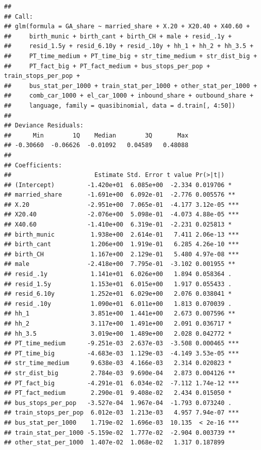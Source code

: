\documentclass[
]{article}
\begin{document}
\begin{verbatim}
## 
## Call:
## glm(formula = GA_share ~ married_share + X.20 + X20.40 + X40.60 + 
##     birth_munic + birth_cant + birth_CH + male + resid_.1y + 
##     resid_1.5y + resid_6.10y + resid_.10y + hh_1 + hh_2 + hh_3.5 + 
##     PT_time_medium + PT_time_big + str_time_medium + str_dist_big + 
##     PT_fact_big + PT_fact_medium + bus_stops_per_pop + train_stops_per_pop + 
##     bus_stat_per_1000 + train_stat_per_1000 + other_stat_per_1000 + 
##     comb_car_1000 + el_car_1000 + inbound_share + outbound_share + 
##     language, family = quasibinomial, data = d.train[, 4:50])
## 
## Deviance Residuals: 
##      Min        1Q    Median        3Q       Max  
## -0.30660  -0.06626  -0.01092   0.04589   0.48088  
## 
## Coefficients:
##                       Estimate Std. Error t value Pr(>|t|)    
## (Intercept)         -1.420e+01  6.085e+00  -2.334 0.019706 *  
## married_share       -1.691e+00  6.092e-01  -2.776 0.005576 ** 
## X.20                -2.951e+00  7.065e-01  -4.177 3.12e-05 ***
## X20.40              -2.076e+00  5.098e-01  -4.073 4.88e-05 ***
## X40.60              -1.410e+00  6.319e-01  -2.231 0.025813 *  
## birth_munic          1.938e+00  2.614e-01   7.411 2.06e-13 ***
## birth_cant           1.206e+00  1.919e-01   6.285 4.26e-10 ***
## birth_CH             1.167e+00  2.129e-01   5.480 4.97e-08 ***
## male                -2.418e+00  7.795e-01  -3.102 0.001955 ** 
## resid_.1y            1.141e+01  6.026e+00   1.894 0.058364 .  
## resid_1.5y           1.153e+01  6.015e+00   1.917 0.055433 .  
## resid_6.10y          1.252e+01  6.029e+00   2.076 0.038041 *  
## resid_.10y           1.090e+01  6.011e+00   1.813 0.070039 .  
## hh_1                 3.851e+00  1.441e+00   2.673 0.007596 ** 
## hh_2                 3.117e+00  1.491e+00   2.091 0.036717 *  
## hh_3.5               3.019e+00  1.489e+00   2.028 0.042772 *  
## PT_time_medium      -9.251e-03  2.637e-03  -3.508 0.000465 ***
## PT_time_big         -4.683e-03  1.129e-03  -4.149 3.53e-05 ***
## str_time_medium      9.638e-03  4.166e-03   2.314 0.020823 *  
## str_dist_big         2.784e-03  9.690e-04   2.873 0.004126 ** 
## PT_fact_big         -4.291e-01  6.034e-02  -7.112 1.74e-12 ***
## PT_fact_medium       2.290e-01  9.408e-02   2.434 0.015050 *  
## bus_stops_per_pop   -3.527e-04  1.967e-04  -1.793 0.073240 .  
## train_stops_per_pop  6.012e-03  1.213e-03   4.957 7.94e-07 ***
## bus_stat_per_1000    1.719e-02  1.696e-03  10.135  < 2e-16 ***
## train_stat_per_1000 -5.159e-02  1.777e-02  -2.904 0.003739 ** 
## other_stat_per_1000  1.407e-02  1.068e-02   1.317 0.187899    

\end{verbatim}
\end{document}
